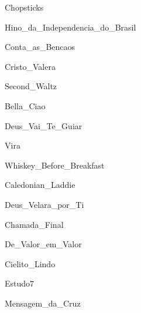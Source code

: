 \documentclass{scrartcl}
\begin{document}

{Chopsticks}


{Hino_da_Independencia_do_Brasil}


{Conta_as_Bencaos}


{Cristo_Valera}


{Second_Waltz}


{Bella_Ciao}


{Deus_Vai_Te_Guiar}


{Vira}


{Whiskey_Before_Breakfast}


{Caledonian_Laddie}


{Deus_Velara_por_Ti}


{Chamada_Final}


{De_Valor_em_Valor}


{Cielito_Lindo}


{Estudo7}


{Mensagem_da_Cruz}
\end{document}
